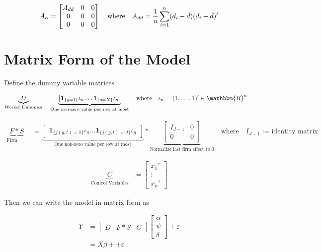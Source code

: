 \documentclass[12pt]{article}
\begin{document}
\begin{align*}
A_{\alpha} = \begin{bmatrix}
A_{dd} & 0 & 0\\
0 & 0 & 0\\
0 & 0 & 0
\end{bmatrix} \quad \text{where} \quad A_{dd} = \frac{1}{n} \sum_{i=1}^n (d_i - \Bar{d})(d_i - \Bar{d})'
\end{align*}



\section{Matrix Form of the Model}

Define the dummy variable matrices

\begin{align*}
    \underbrace{D}_\text{Worker Dummies} &= \underbrace{\begin{bmatrix} \boldsymbol{1}_{\{g=1\}} \iota_n \dots \boldsymbol{1}_{\{g=N\}} \iota_n  \end{bmatrix}}_\text{One non-zero value per row at most} \quad \text{where} \quad \iota_n = (1, \dots, 1)' \in \mathbbm{R}^n
\end{align*}

\begin{align*}
    \underbrace{F*S}_\text{Firm Dummies} &= \underbrace{\begin{bmatrix} \boldsymbol{1}_{\{j(g,t)=1\}} \iota_n \dots \boldsymbol{1}_{\{j(g,t)=J\}} \iota_n  \end{bmatrix}}_\text{One non-zero value per row at most} * \underbrace{\begin{bmatrix} I_{J-1} & 0 \\ 0 & 0 \end{bmatrix}}_\text{Normalize last firm effect to 0}
    \quad \text{where} \quad I_{J-1}:= \text{identity matrix}
\end{align*}


\begin{align*}
    \underbrace{C}_\text{Control Variables} &= \begin{bmatrix} x_1' \\ \vdots \\ x_n'  \end{bmatrix}
\end{align*}

Then we can write the model in matrix form as

 \begin{align*}
     Y &= \begin{bmatrix} D & F*S & C \end{bmatrix} \begin{bmatrix} \alpha \\ \psi \\ \delta \end{bmatrix} + \varepsilon\\
     &= X \beta + + \varepsilon
\end{align*}
          
\end{document}
